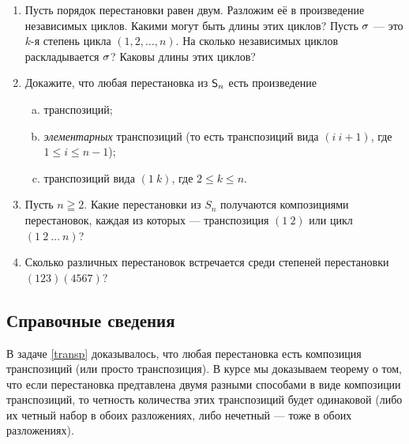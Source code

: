 \begin{enumerate}
\item \ipunkt Пусть порядок перестановки равен двум. Разложим её в
произведение независимых циклов. Какими могут быть длины этих
циклов? \ipunkt Пусть $\sigma$ --- это $k$-я степень цикла $(1, 2, \dots , n)$. На сколько
независимых циклов раскладывается $\sigma$? Каковы длины этих циклов?

\item \label{transp}Докажите, что любая перестановка из ${\mathsf{S}}_n$ есть произведение
\begin{enumerate}[a)]
\item транспозиций;
\item {\em элементарных} транспозиций (то есть транспозиций вида $(i\ i+1)$, где $1\leq i\leq n-1$);
\item транспозиций вида $(1\ k)$, где $2\leq k\leq n$.
\end{enumerate}


\item Пусть $n\geqq2$. Какие перестановки из $S_n$ получаются композициями перестановок, каждая из которых --- 
транспозиция $(1\ 2)$ или цикл $(1\ 2\ \ldots\ n)$?

\item  Сколько различных перестановок встречается среди степеней
перестановки $(123)(4567)$?


\end{enumerate}

\subsection*{Справочные сведения}

В задаче \ref{transp} доказывалось, что любая перестановка есть композиция транспозиций (или просто транспозиция). В курсе мы доказываем теорему о том, что если перестановка предтавлена двумя разными способами в виде композиции транспозиций, то четность количества этих транспозиций будет одинаковой (либо их четный набор в обоих разложениях, либо нечетный --- тоже в обоих разложениях).

